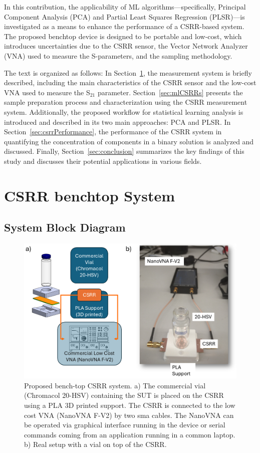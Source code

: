 \documentclass[journal,twoside,web]{ieeecolor}
\begin{document}
In this contribution, the applicability of ML algorithms—specifically, Principal Component Analysis (PCA) and Partial Least Squares Regression (PLSR)—is investigated as a means to enhance the performance of a CSRR-based system. The proposed benchtop device is designed to be portable and low-cost, which introduces uncertainties due to the CSRR sensor, the Vector Network Analyzer (VNA) used to measure the S-parameters, and the sampling methodology. 

The text is organized as follows: In Section~\ref{sec:csrrbenchTop}, the measurement system is briefly described, including the main characteristics of the CSRR sensor and the low-cost VNA used to measure the S$_{21}$ parameter. Section~\ref{sec:mlCSRRs} presents the sample preparation process and characterization using the CSRR measurement system. Additionally, the proposed workflow for statistical learning analysis is introduced and described in its two main approaches: PCA and PLSR. In Section~\ref{sec:csrrPerformance}, the performance of the CSRR system in quantifying the concentration of components in a binary solution is analyzed and discussed. Finally, Section~\ref{sec:conclusion} summarizes the key findings of this study and discusses their potential applications in various fields.        

\section{CSRR benchtop System}\label{sec:csrrbenchTop}
\subsection{System Block Diagram}\label{ssec:sysBlockD}

\begin{figure}[!t]
	\centering
	\includegraphics [trim = 0mm 0mm 0mm 0mm, clip, width=1\columnwidth]{figures/fig1.png}
	\caption{Proposed bench-top CSRR system. a) The commercial vial (Chromacol 20-HSV) containing the SUT is placed on the CSRR using a PLA 3D printed support. The CSRR is connected to the low cost VNA (NanoVNA F-V2) by two sma cables. The NanoVNA can be operated via graphical interface running in the device or serial commands coming from an application running in a common laptop. b) Real setup with a vial on top of the CSRR.}
	\label{fig:senBlockD}
	\vspace{-0.3cm}
\end{figure}
\end{document}
